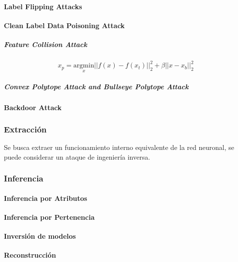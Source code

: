 \paragraph{Label Flipping Attacks}

\paragraph{Clean Label Data Poisoning Attack}

\subparagraph{Feature Collision Attack}

\begin{equation}
    x_{p}={\underset{x}{\mathrm{argmin}}}||f\left(x\right)-f\left(x_{t}\right)||_{2}^{2}+\beta||x-x_{b}||_{2}^{2}
\end{equation}


\subparagraph{Convex Polytope Attack and Bullseye Polytope Attack}

\paragraph{Backdoor Attack}


\subsubsection{Extracción}

Se busca extraer un funcionamiento interno equivalente de la red neuronal, se puede considerar un ataque de ingeniería inversa.

% 
\subsubsection{Inferencia}

\paragraph{Inferencia por Atributos}
\paragraph{Inferencia por Pertenencia}
\paragraph{Inversión de modelos}
\paragraph{Reconstrucción}

